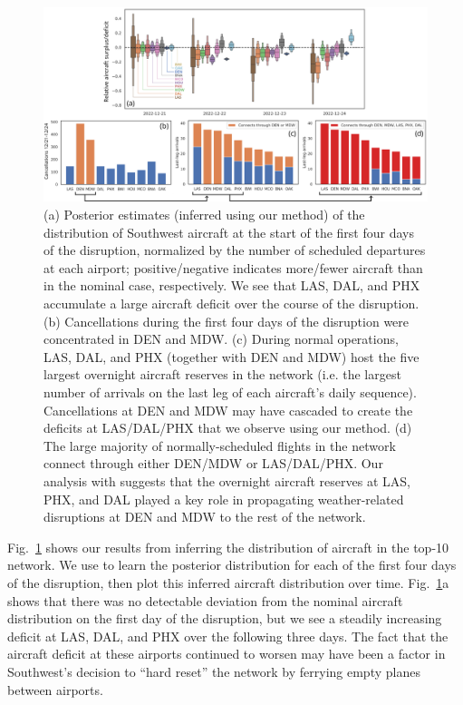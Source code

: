 \begin{figure}[htb]
    \centering
    \includegraphics[width=\linewidth]{images/icml/wn/wn_reserves.pdf}
    \caption{(a) Posterior estimates (inferred using our method) of the distribution of Southwest aircraft at the start of the first four days of the disruption, normalized by the number of scheduled departures at each airport; positive/negative indicates more/fewer aircraft than in the nominal case, respectively. We see that LAS, DAL, and PHX accumulate a large aircraft deficit over the course of the disruption.
        (b) Cancellations during the first four days of the disruption were concentrated in DEN and MDW.
        (c) During normal operations, LAS, DAL, and PHX (together with DEN and MDW) host the five largest overnight aircraft reserves in the network (i.e. the largest number of arrivals on the last leg of each aircraft's daily sequence). Cancellations at DEN and MDW may have cascaded to create the deficits at LAS/DAL/PHX that we observe using our method.
        (d) The large majority of normally-scheduled flights in the network connect through either DEN/MDW or LAS/DAL/PHX. Our analysis with \ouralg{} suggests that the overnight aircraft reserves at LAS, PHX, and DAL played a key role in propagating weather-related disruptions at DEN and MDW to the rest of the network.
    }
    \label{ch:icml:fig:wn_reserves}
\end{figure}

Fig.~\ref{ch:icml:fig:wn_reserves} shows our results from inferring the distribution of aircraft in the top-10 network. We use \ouralg{} to learn the posterior distribution for each of the first four days of the disruption, then plot this inferred aircraft distribution over time. Fig.~\ref{ch:icml:fig:wn_reserves}a shows that there was no detectable deviation from the nominal aircraft distribution on the first day of the disruption, but we see a steadily increasing deficit at LAS, DAL, and PHX over the following three days. The fact that the aircraft deficit at these airports continued to worsen may have been a factor in Southwest's decision to ``hard reset'' the network by ferrying empty planes between airports.

